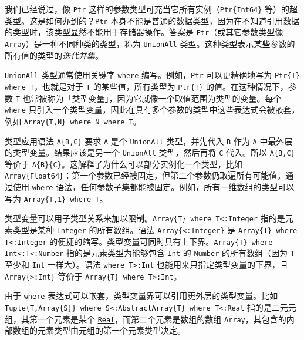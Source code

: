 我们已经说过，像 \texttt{Ptr} 这样的参数类型可充当它所有实例（\texttt{Ptr\{Int64\}} 等）的超类型。这是如何办到的？\texttt{Ptr} 本身不能是普通的数据类型，因为在不知道引用数据的类型时，该类型显然不能用于存储器操作。答案是 \texttt{Ptr}（或其它参数类型像 \texttt{Array}）是一种不同种类的类型，称为 \hyperlink{13291956087044414878}{\texttt{UnionAll}} 类型。这种类型表示某些参数的所有值的类型的\emph{迭代并集}。



\texttt{UnionAll} 类型通常使用关键字 \texttt{where} 编写。例如，\texttt{Ptr} 可以更精确地写为 \texttt{Ptr\{T\} where T}，也就是对于 \texttt{T} 的某些值，所有类型为 \texttt{Ptr\{T\}} 的值。在这种情况下，参数 \texttt{T} 也常被称为「类型变量」，因为它就像一个取值范围为类型的变量。每个 \texttt{where} 只引入一个类型变量，因此在具有多个参数的类型中这些表达式会被嵌套，例如 \texttt{Array\{T,N\} where N where T}。



类型应用语法 \texttt{A\{B,C\}} 要求 \texttt{A} 是个 \texttt{UnionAll} 类型，并先代入 \texttt{B} 作为 \texttt{A} 中最外层的类型变量。结果应该是另一个 \texttt{UnionAll} 类型，然后再将 \texttt{C} 代入。所以 \texttt{A\{B,C\}} 等价于 \texttt{A\{B\}\{C\}}。这解释了为什么可以部分实例化一个类型，比如 \texttt{Array\{Float64\}}：第一个参数已经被固定，但第二个参数仍取遍所有可能值。通过使用 \texttt{where} 语法，任何参数子集都能被固定。例如，所有一维数组的类型可以写为 \texttt{Array\{T,1\} where T}。



类型变量可以用子类型关系来加以限制。\texttt{Array\{T\} where T<:Integer} 指的是元素类型是某种 \hyperlink{8469131683393450448}{\texttt{Integer}} 的所有数组。语法 \texttt{Array\{<:Integer\}} 是 \texttt{Array\{T\} where T<:Integer} 的便捷的缩写。类型变量可同时具有上下界。\texttt{Array\{T\} where Int<:T<:Number} 指的是元素类型为能够包含 \texttt{Int} 的 \hyperlink{1990584313715697055}{\texttt{Number}} 的所有数组（因为 \texttt{T} 至少和 \texttt{Int} 一样大）。语法 \texttt{where T>:Int} 也能用来只指定类型变量的下界，且 \texttt{Array\{>:Int\}} 等价于 \texttt{Array\{T\} where T>:Int}。



由于 \texttt{where} 表达式可以嵌套，类型变量界可以引用更外层的类型变量。比如 \texttt{Tuple\{T,Array\{S\}\} where S<:AbstractArray\{T\} where T<:Real} 指的是二元元组，其第一个元素是某个 \hyperlink{6175959395021454412}{\texttt{Real}}，而第二个元素是数组的数组 \texttt{Array}，其包含的内部数组的元素类型由元组的第一个元素类型决定。



